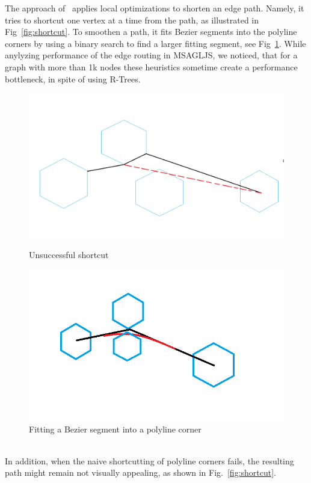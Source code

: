 \documentclass{gd-llncs}
\begin{document}
The approach of~\cite{dwyer2010fast} applies local optimizations to shorten an edge path.  
Namely, it tries to shortcut one vertex at a time from the path, as illustrated in Fig~\ref{fig:shortcut}. 
To smoothen a path, it fits Bezier segments into the polyline corners by 
using a binary search to find a larger fitting segment, see Fig~\ref{fig:cornerfit}. 
While anylyzing performance of the edge routing in MSAGLJS, 
we noticed, that for a graph with more than 1k nodes these heuristics 
sometime create a performance bottleneck, in spite of using R-Trees\cite{guttman1984r}.
\begin{figure}[!tbp]
  \centering
  \begin{minipage}[b]{0.4\textwidth}
    \includegraphics[width=\textwidth]{./naive_shorcut_now_working.png}
    \caption{Unsuccessful shortcut}
    \label{fig:shortcut}
  \end{minipage}
  \hfill
  \begin{minipage}[b]{0.4\textwidth}
    \includegraphics[width=\textwidth]{fillet_corner.png}
    \caption{Fitting a Bezier segment into a polyline corner}
    \label{fig:cornerfit}
  \end{minipage}
\end{figure}
\\
In addition, when the naive shortcutting of polyline corners fails,  the resulting path might remain not visually appealing, as shown in Fig.~\ref{fig:shortcut}.
\end{document}
